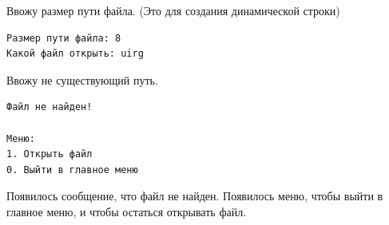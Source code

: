 Ввожу размер пути файла. (Это для создания динамической строки)
    
\begin{tcolorbox}
\begin{verbatim}
Размер пути файла: 8
Какой файл открыть: uirg
\end{verbatim}
\end{tcolorbox}

Ввожу не существующий путь.

\begin{tcolorbox}
\begin{verbatim}
Файл не найден!

Меню:
1. Открыть файл
0. Выйти в главное меню
\end{verbatim}
\end{tcolorbox}

Появилось сообщение, что файл не найден. Появилось меню, чтобы выйти в главное меню, и чтобы остаться открывать файл.
